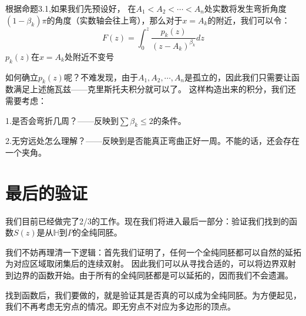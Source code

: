 \documentclass[UTF8]{ctexart}[a4paper,10pt]
\def\H{\mathbb{H}}
\begin{document}
    根据命题3.1,如果我们先预设好，
    在$A_1<A_2<\cdots<A_n$处实数将发生弯折角度$(1-\beta_k)\pi$的角度（实数轴会往上弯），那么对于$x=A_k$的附近，我们可以令：
    \begin{equation*}
        F(z)=\int_0^{z}\frac{p_k(z)}{(z-A_k)^{\beta_k}}dz
    \end{equation*}
    $p_k(z)$在$x=A_k$处附近不变号
    
    如何确立$p_k(z)$呢？不难发现，由于$A_1,A_2,\cdots,A_n$是孤立的，因此我们只需要让函数满足上述施瓦兹——克里斯托夫积分就可以了。
    这样构造出来的积分，我们还需要考虑：

    1.是否会弯折几周？——反映到$\sum \beta_k\leq 2$的条件。

    2.无穷远处怎么理解？——反映到是否能真正弯曲正好一周。不能的话，还会存在一个夹角。
    \section{最后的验证}
    我们目前已经做完了2/3的工作。现在我们将进入最后一部分：验证我们找到的函数$S(z)$是从$\H$到$P$的全纯同胚。

    我们不妨再理清一下逻辑：首先我们证明了，任何一个全纯同胚都可以自然的延拓为对应区域取闭集后的连续双射。
    因此我们可以从寻找合适的，可以将边界双射到边界的函数开始。由于所有的全纯同胚都是可以延拓的，因而我们不会遗漏。
    
    找到函数后，我们要做的，就是验证其是否真的可以成为全纯同胚。为方便起见，我们不再考虑无穷点的情况。即无穷点不对应为多边形的顶点。
\end{document}
